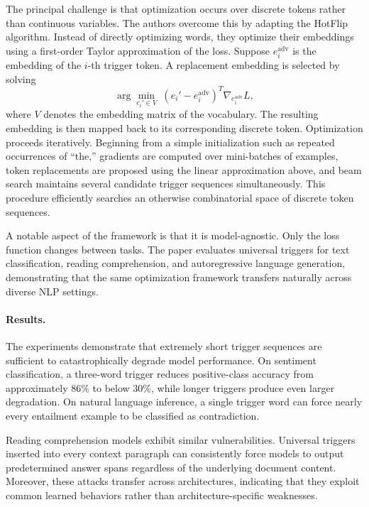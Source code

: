 \documentclass[11pt]{article}
\begin{document}
The principal challenge is that optimization occurs over discrete tokens rather than continuous variables. The authors overcome this by adapting the HotFlip algorithm. Instead of directly optimizing words, they optimize their embeddings using a first-order Taylor approximation of the loss. Suppose \(e_i^{\mathrm{adv}}\) is the embedding of the \(i\)-th trigger token. A replacement embedding is selected by solving
\[
\arg\min_{e_i'\in V}
\;
(e_i'-e_i^{\mathrm{adv}})^T
\nabla_{e_i^{\mathrm{adv}}}L,
\]
where \(V\) denotes the embedding matrix of the vocabulary. The resulting embedding is then mapped back to its corresponding discrete token.
Optimization proceeds iteratively. Beginning from a simple initialization such as repeated occurrences of ``the,'' gradients are computed over mini-batches of examples, token replacements are proposed using the linear approximation above, and beam search maintains several candidate trigger sequences simultaneously. This procedure efficiently searches an otherwise combinatorial space of discrete token sequences.

A notable aspect of the framework is that it is model-agnostic. Only the loss function changes between tasks. The paper evaluates universal triggers for text classification, reading comprehension, and autoregressive language generation, demonstrating that the same optimization framework transfers naturally across diverse NLP settings.

\paragraph{Results.}

The experiments demonstrate that extremely short trigger sequences are sufficient to catastrophically degrade model performance. On sentiment classification, a three-word trigger reduces positive-class accuracy from approximately \(86\%\) to below \(30\%\), while longer triggers produce even larger degradation. On natural language inference, a single trigger word can force nearly every entailment example to be classified as contradiction.

Reading comprehension models exhibit similar vulnerabilities. Universal triggers inserted into every context paragraph can consistently force models to output predetermined answer spans regardless of the underlying document content. Moreover, these attacks transfer across architectures, indicating that they exploit common learned behaviors rather than architecture-specific weaknesses.
\end{document}
